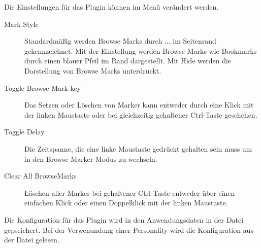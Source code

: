 Die Einstellungen für das Plugin können im Menü  verändert werden.

\begin{description}
\item[Mark Style] Standardmäßig werden Browse Marks durch $\ldots$ im Seitenrand gekennzeichnet. Mit der Einstellung  werden Browse Marks wie Bookmarks durch einen blauer Pfeil im Rand dargestellt. Mit Hide werden die Darstellung von Browse Marks unterdrückt.
\item[Toggle Browse Mark key] Das Setzen oder Löschen von Marker kann entweder durch eine Klick mit der linken Maustaste oder bei gleichzeitig gehaltener Ctrl-Taste geschehen.
\item[Toggle Delay] Die Zeitspanne, die eine linke Maustaste gedrückt gehalten sein muss um in den Browse Marker Modus zu wechseln.
\item[Clear All BrowseMarks] Löschen aller Marker bei gehaltener Ctrl Taste entweder über einen einfachen Klick oder einen Doppelklick mit der linken Maustaste.
\end{description}

Die Konfiguration für das Plugin wird in den Anwendungsdaten in der Datei  gepseichert. Bei der Verwenundung einer Personality wird die Konfiguration aus der Datei  gelesen.
